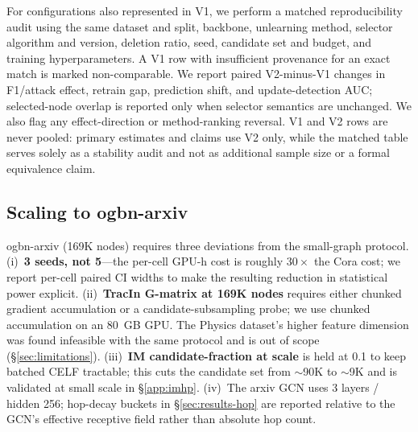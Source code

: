 For configurations also represented in V1, we perform a matched
reproducibility audit using the same dataset and split, backbone,
unlearning method, selector algorithm and version, deletion ratio, seed,
candidate set and budget, and training hyperparameters. A V1 row with
insufficient provenance for an exact match is marked non-comparable. We
report paired V2-minus-V1 changes in F1/attack effect, retrain gap,
prediction shift, and update-detection AUC; selected-node overlap is
reported only when selector semantics are unchanged. We also flag any
effect-direction or method-ranking reversal. V1 and V2 rows are never
pooled: primary estimates and claims use V2 only, while the matched table
serves solely as a stability audit and not as additional sample size or a
formal equivalence claim.

\subsection{Scaling to ogbn-arxiv}
\label{sec:setup-arxiv}

ogbn-arxiv (169K nodes) requires three deviations from the
small-graph protocol. (i)~\textbf{3 seeds, not 5}---the per-cell
GPU-h cost is roughly $30\times$ the Cora cost; we report per-cell paired
CI widths to make the resulting reduction in statistical power explicit.
(ii)~\textbf{TracIn G-matrix at 169K nodes} requires either chunked
gradient accumulation or a candidate-subsampling probe; we use chunked
accumulation on an 80~GB GPU. The Physics dataset's higher feature
dimension was found infeasible with the same protocol and is out of
scope (\S\ref{sec:limitations}). (iii)~\textbf{IM candidate-fraction at
scale} is held at 0.1 to keep batched CELF tractable; this cuts the
candidate set from $\sim$90K to $\sim$9K and is validated at small scale
in \S\ref{app:imhp}. (iv)~The arxiv GCN uses 3 layers / hidden 256;
hop-decay buckets in \S\ref{sec:results-hop} are reported relative to
the GCN's effective receptive field rather than absolute hop count.
